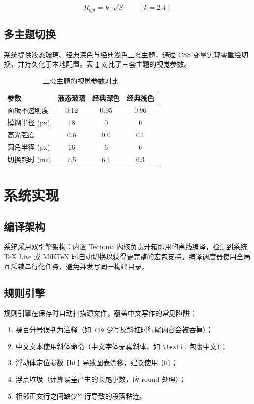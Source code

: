 \documentclass[11pt]{ctexart}
\begin{document}
\begin{equation}
R_{opt} = k \cdot \sqrt{S} \qquad (k = 2.4)
\label{eq:blur}
\end{equation}

\subsection{多主题切换}

系统提供液态玻璃、经典深色与经典浅色三套主题，通过 CSS 变量实现零重绘切换，并持久化于本地配置。表 \ref{tab:theme} 对比了三套主题的视觉参数。

\begin{table}[H]
\centering
\caption{三套主题的视觉参数对比}
\label{tab:theme}
\begin{tabular}{lccc}
\toprule
参数 & 液态玻璃 & 经典深色 & 经典浅色 \\
\midrule
面板不透明度 & 0.12 & 0.95 & 0.96 \\
模糊半径 (px) & 18 & 0 & 0 \\
高光强度 & 0.6 & 0.0 & 0.1 \\
圆角半径 (px) & 16 & 6 & 6 \\
切换耗时 (ms) & 7.5 & 6.1 & 6.3 \\
\bottomrule
\end{tabular}
\end{table}

\section{系统实现}

\subsection{编译架构}

系统采用双引擎架构：内置 Tectonic 内核负责开箱即用的离线编译，检测到系统 TeX Live 或 MiKTeX 时自动切换以获得更完整的宏包支持。编译调度器使用全局互斥锁串行化任务，避免并发写同一构建目录。

\subsection{规则引擎}

规则引擎在保存时自动扫描源文件，覆盖中文写作的常见陷阱：

\begin{enumerate}
\item 裸百分号误判为注释（如 \texttt{71\%} 少写反斜杠时行尾内容会被吞掉）；
\item 中文文本使用斜体命令（中文字体无真斜体，如 \texttt{\textbackslash textit} 包裹中文）；
\item 浮动体定位参数 \texttt{[ht]} 导致图表漂移，建议使用 \texttt{[H]}；
\item 浮点垃圾（计算误差产生的长尾小数，应 round 处理）；
\item 相邻正文行之间缺少空行导致的段落粘连。
\end{enumerate}
\end{document}
